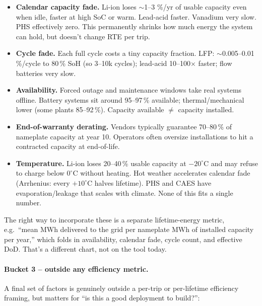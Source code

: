 \begin{itemize}
    \item \textbf{Calendar capacity fade.} Li-ion loses
    $\sim$1--3 \%/yr of usable capacity even when idle, faster at
    high SoC or warm. Lead-acid faster. Vanadium very slow. PHS
    effectively zero. This permanently shrinks how much energy the
    system can hold, but doesn't change RTE per trip.
    \item \textbf{Cycle fade.} Each full cycle costs a tiny capacity
    fraction. LFP: $\sim$0.005--0.01\,\%/cycle to 80\,\% SoH (so 3--10k
    cycles); lead-acid 10--100$\times$ faster; flow batteries very
    slow.
    \item \textbf{Availability.} Forced outage and maintenance
    windows take real systems offline. Battery systems sit around
    95--97\,\% available; thermal/mechanical lower (some plants 85--92\,\%).
    Capacity available $\neq$ capacity installed.
    \item \textbf{End-of-warranty derating.} Vendors typically
    guarantee 70--80\,\% of nameplate capacity at year 10. Operators
    often oversize installations to hit a contracted capacity at
    end-of-life.
    \item \textbf{Temperature.} Li-ion loses 20--40\,\% usable
    capacity at $-20^{\circ}\mathrm{C}$ and may refuse to charge below
    $0^{\circ}\mathrm{C}$ without heating. Hot weather accelerates
    calendar fade (Arrhenius: every $+10^{\circ}\mathrm{C}$ halves
    lifetime). PHS and CAES have evaporation/leakage that scales with
    climate. None of this fits a single number.
\end{itemize}

The right way to incorporate these is a separate lifetime-energy
metric, e.g.\ ``mean MWh delivered to the grid per nameplate MWh of
installed capacity per year,'' which folds in availability, calendar
fade, cycle count, and effective DoD. That's a different chart, not
on the tool today.

\paragraph{Bucket 3 -- outside any efficiency metric.}
A final set of factors is genuinely outside a per-trip or
per-lifetime efficiency framing, but matters for ``is this a good
deployment to build?'':

